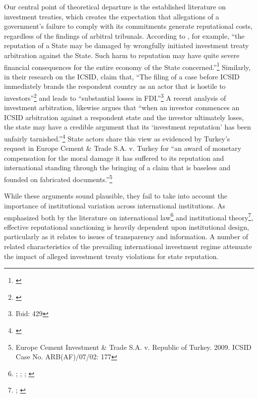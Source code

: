 \documentclass[12pt,onesided]{amsart}
\begin{document}
Our central point of theoretical departure is the established literature on investment treaties, which creates the expectation that allegations of a government's failure to comply with its commitments generate reputational costs, regardless of the findings of arbitral tribunals. According to \citeauthor{schwenzer:hachem:2011}, for example, ``the reputation of a State may be damaged by wrongfully initiated investment treaty arbitration against the State. Such harm to reputation may have quite severe financial consequences for the entire economy of the State concerned.''\footnote{\citet[p. 426]{schwenzer:hachem:2011}} Similarly, in their research on the ICSID, \citeauthor{allee:peinhardt:2011} claim that, ``The filing of a case before ICSID immediately brands the respondent country as an actor that is hostile to investors''\footnote{\citet[p. 414]{allee:peinhardt:2011}} and leads to ``substantial losses in FDI.''\footnote{Ibid: 429} A recent analysis of investment arbitration, likewise argues that ``when an investor commences an ICSID arbitration against a respondent state and the investor ultimately loses, the state may have a credible argument that its `investment reputation' has been unfairly tarnished.''\footnote{\citet[p. 236]{parish2011awarding}} State actors share this view as evidenced by Turkey's request in Europe Cement \& Trade S.A. v. Turkey for ``an award of monetary compensation for the moral damage it has suffered to its reputation and international standing through the bringing of a claim that is baseless and founded on fabricated documents.''\footnote{Europe Cement Investment \& Trade S.A. v. Republic of Turkey. 2009. ICSID Case No. ARB(AF)/07/02: 177} 

While these arguments sound plausible, they fail to take into account the importance of institutional variation across international institutions. As emphasized both by the literature on international law\footnote{\citet{staton2011judicial}; \citet{cavallaro2008reevaluating}; \citet{guzman2008reputation}; \citet{guzman2008international}} and institutional theory\footnote{\citet[p. 59]{knight1992institutions}; \citet[p. 54--60]{north1990institutions}}, effective reputational sanctioning is heavily dependent upon institutional design, particularly as it relates to issues of transparency and information. A number of related characteristics of the prevailing international investment regime attenuate the impact of alleged investment treaty violations for state reputation. 
\end{document}
